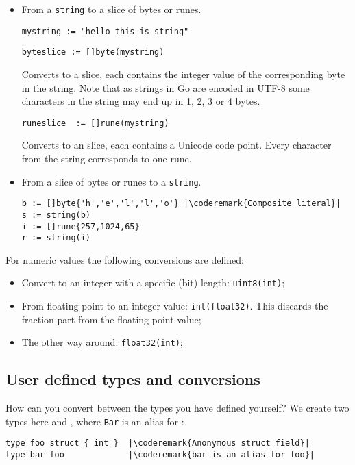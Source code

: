 \begin{itemize}
\item{
From a \lstinline{string} to a slice of bytes or runes.
\begin{lstlisting}
mystring := "hello this is string"
\end{lstlisting}

\begin{lstlisting}
byteslice := []byte(mystring)
\end{lstlisting}
Converts to a  slice, each  contains the integer value
of the corresponding byte in the string. Note that as strings in Go
are encoded in UTF-8 some characters in the string may end up in 1, 2, 3
or 4 bytes.
\begin{lstlisting}
runeslice  := []rune(mystring)
\end{lstlisting}
Converts to an  slice, each  contains a Unicode code
point. Every character from the string corresponds to one rune.
}
\item{
From a slice of bytes or runes to a \lstinline{string}.
\begin{lstlisting}
b := []byte{'h','e','l','l','o'} |\coderemark{Composite literal}|
s := string(b)
i := []rune{257,1024,65} 
r := string(i)
\end{lstlisting}
}
\end{itemize}
For numeric values the following conversions are defined:
\begin{itemize}
\item{Convert to an integer with a specific (bit) length:
\lstinline{uint8(int)};}
\item{From floating point to an integer value: 
\lstinline{int(float32)}. This discards the fraction part
from the floating point value;}
\item{The other way around: \lstinline{float32(int)};}
\end{itemize}

\subsection{User defined types and conversions}
How can you convert between the types you have defined
yourself?
We create two types here  and , where
\lstinline{Bar} is an alias for :
\begin{lstlisting}
type foo struct { int }  |\coderemark{Anonymous struct field}|
type bar foo             |\coderemark{bar is an alias for foo}|
\end{lstlisting}

